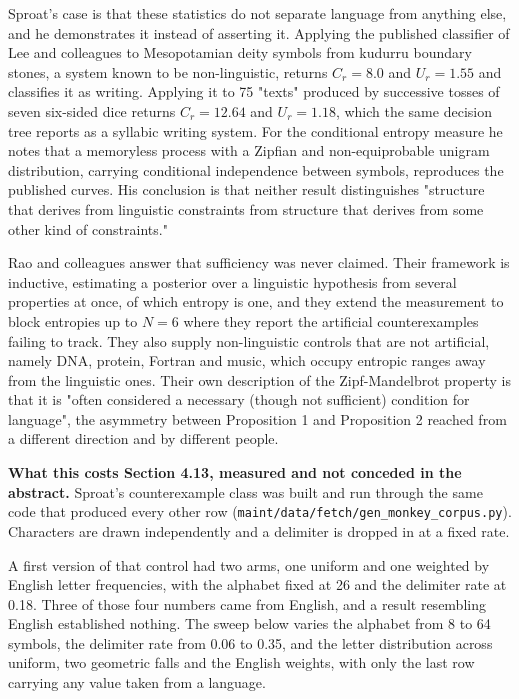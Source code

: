 Sproat's case is that these statistics do not separate language from anything else, and he demonstrates it instead of asserting it. Applying the published classifier of Lee and colleagues to Mesopotamian deity symbols from kudurru boundary stones, a system known to be non-linguistic, returns \(C_r = 8.0\) and \(U_r = 1.55\) and classifies it as writing. Applying it to 75 "texts" produced by successive tosses of seven six-sided dice returns \(C_r = 12.64\) and \(U_r = 1.18\), which the same decision tree reports as a syllabic writing system. For the conditional entropy measure he notes that a memoryless process with a Zipfian and non-equiprobable unigram distribution, carrying conditional independence between symbols, reproduces the published curves. His conclusion is that neither result distinguishes "structure that derives from linguistic constraints from structure that derives from some other kind of constraints."

Rao and colleagues answer that sufficiency was never claimed. Their framework is inductive, estimating a posterior over a linguistic hypothesis from several properties at once, of which entropy is one, and they extend the measurement to block entropies up to \(N = 6\) where they report the artificial counterexamples failing to track. They also supply non-linguistic controls that are not artificial, namely DNA, protein, Fortran and music, which occupy entropic ranges away from the linguistic ones. Their own description of the Zipf-Mandelbrot property is that it is "often considered a necessary (though not sufficient) condition for language", the asymmetry between Proposition 1 and Proposition 2 reached from a different direction and by different people.

\textbf{What this costs Section 4.13, measured and not conceded in the abstract.} Sproat's counterexample class was built and run through the same code that produced every other row (\texttt{maint/\allowbreak{}data/\allowbreak{}fetch/\allowbreak{}gen\_\allowbreak{}monkey\_\allowbreak{}corpus.\allowbreak{}py}). Characters are drawn independently and a delimiter is dropped in at a fixed rate.

A first version of that control had two arms, one uniform and one weighted by English letter frequencies, with the alphabet fixed at 26 and the delimiter rate at 0.18. Three of those four numbers came from English, and a result resembling English established nothing. The sweep below varies the alphabet from 8 to 64 symbols, the delimiter rate from 0.06 to 0.35, and the letter distribution across uniform, two geometric falls and the English weights, with only the last row carrying any value taken from a language.

